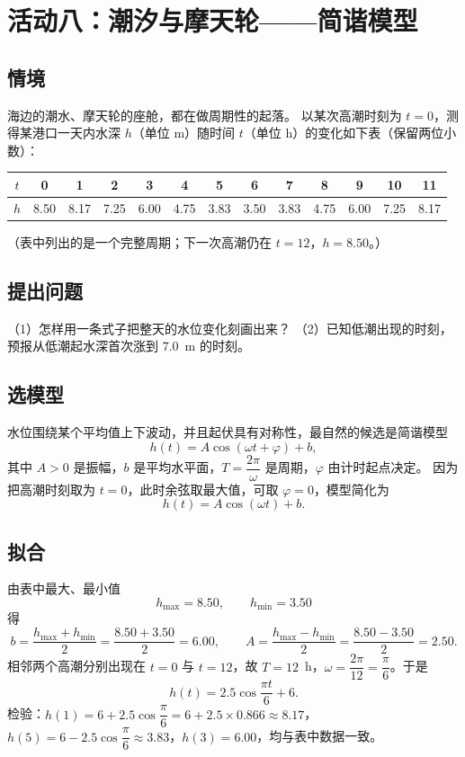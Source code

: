 \section{活动八：潮汐与摩天轮——简谐模型}

\subsection{情境}
海边的潮水、摩天轮的座舱，都在做周期性的起落。
以某次高潮时刻为 $t=0$，测得某港口一天内水深 $h$（单位 m）随时间 $t$（单位 h）的变化如下表（保留两位小数）：

\begin{center}
\footnotesize
\setlength{\tabcolsep}{5pt}
\renewcommand{\arraystretch}{1.3}
\begin{tabular}{c|cccccccccccc}
\toprule
$t$ & 0 & 1 & 2 & 3 & 4 & 5 & 6 & 7 & 8 & 9 & 10 & 11 \\
\midrule
$h$ & 8.50 & 8.17 & 7.25 & 6.00 & 4.75 & 3.83 & 3.50 & 3.83 & 4.75 & 6.00 & 7.25 & 8.17 \\
\bottomrule
\end{tabular}
\end{center}

（表中列出的是一个完整周期；下一次高潮仍在 $t=12$，$h=8.50$。）

\subsection{提出问题}
（1）怎样用一条式子把整天的水位变化刻画出来？
（2）已知低潮出现的时刻，预报从低潮起水深首次涨到 $7.0$~m 的时刻。

\subsection{选模型}
水位围绕某个平均值上下波动，并且起伏具有对称性，最自然的候选是简谐模型
\[
  h(t)=A\cos(\omega t+\varphi)+b,
\]
其中 $A>0$ 是振幅，$b$ 是平均水平面，$T=\dfrac{2\pi}{\omega}$ 是周期，$\varphi$ 由计时起点决定。
因为把高潮时刻取为 $t=0$，此时余弦取最大值，可取 $\varphi=0$，模型简化为
\[
  h(t)=A\cos(\omega t)+b.
\]

\subsection{拟合}
由表中最大、最小值
\[
  h_{\max}=8.50,\qquad h_{\min}=3.50
\]
得
\[
  b=\frac{h_{\max}+h_{\min}}{2}=\frac{8.50+3.50}{2}=6.00,\qquad
  A=\frac{h_{\max}-h_{\min}}{2}=\frac{8.50-3.50}{2}=2.50.
\]
相邻两个高潮分别出现在 $t=0$ 与 $t=12$，故 $T=12$~h，$\omega=\dfrac{2\pi}{12}=\dfrac{\pi}{6}$。于是
\[
  h(t)=2.5\cos\frac{\pi t}{6}+6.
\]
检验：$h(1)=6+2.5\cos\dfrac{\pi}{6}=6+2.5\times0.866\approx8.17$，
$h(5)=6-2.5\cos\dfrac{\pi}{6}\approx3.83$，$h(3)=6.00$，均与表中数据一致。

